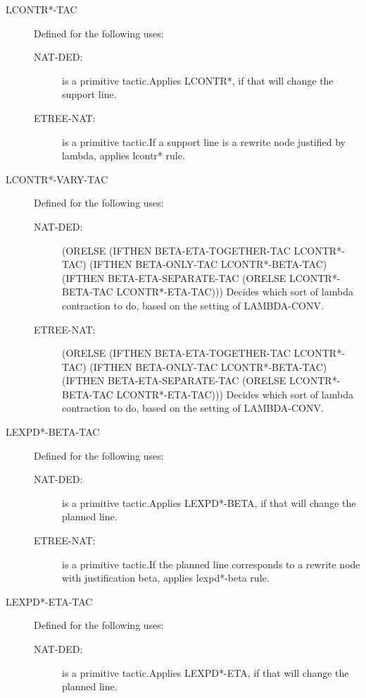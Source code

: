 \begin{description}
\begin{description}
\end{description}

\item[LCONTR*-TAC]  Defined for the following uses:
\begin{description}
\item[NAT-DED:]  is a primitive tactic.Applies LCONTR*, if that will change the support line.

\item[ETREE-NAT:]  is a primitive tactic.If a support line is a rewrite node justified by lambda, applies
lcontr* rule.

\end{description}

\item[LCONTR*-VARY-TAC]  Defined for the following uses:
\begin{description}
\item[NAT-DED:] 
(ORELSE (IFTHEN BETA-ETA-TOGETHER-TAC LCONTR*-TAC)
 (IFTHEN BETA-ONLY-TAC LCONTR*-BETA-TAC)
 (IFTHEN BETA-ETA-SEPARATE-TAC
  (ORELSE LCONTR*-BETA-TAC LCONTR*-ETA-TAC)))
Decides which sort of lambda contraction to do, based
on the setting of LAMBDA-CONV.

\item[ETREE-NAT:] 
(ORELSE (IFTHEN BETA-ETA-TOGETHER-TAC LCONTR*-TAC)
 (IFTHEN BETA-ONLY-TAC LCONTR*-BETA-TAC)
 (IFTHEN BETA-ETA-SEPARATE-TAC
  (ORELSE LCONTR*-BETA-TAC LCONTR*-ETA-TAC)))
Decides which sort of lambda contraction to do, based
on the setting of LAMBDA-CONV.

\end{description}

\item[LEXPD*-BETA-TAC]  Defined for the following uses:
\begin{description}
\item[NAT-DED:]  is a primitive tactic.Applies LEXPD*-BETA, if that will change the planned line.

\item[ETREE-NAT:]  is a primitive tactic.If the planned line corresponds to a rewrite node with justification
beta, applies lexpd*-beta rule.

\end{description}

\item[LEXPD*-ETA-TAC]  Defined for the following uses:
\begin{description}
\item[NAT-DED:]  is a primitive tactic.Applies LEXPD*-ETA, if that will change the planned line.


\end{description}
\end{description}
